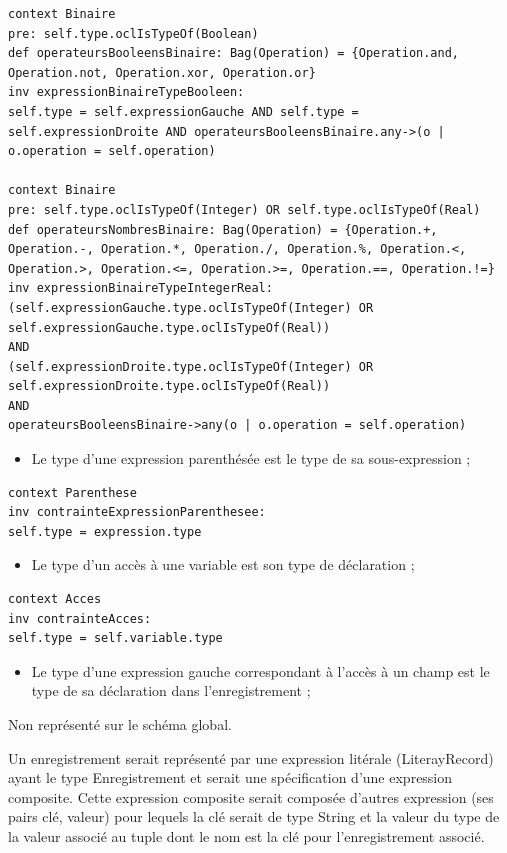 \documentclass[]{article}
\providecommand{\tightlist}{%
  \setlength{\itemsep}{0pt}\setlength{\parskip}{0pt}}
\begin{document}
\begin{verbatim}
context Binaire
pre: self.type.oclIsTypeOf(Boolean)
def operateursBooleensBinaire: Bag(Operation) = {Operation.and, Operation.not, Operation.xor, Operation.or}
inv expressionBinaireTypeBooleen: 
self.type = self.expressionGauche AND self.type = self.expressionDroite AND operateursBooleensBinaire.any->(o | o.operation = self.operation)

context Binaire
pre: self.type.oclIsTypeOf(Integer) OR self.type.oclIsTypeOf(Real)
def operateursNombresBinaire: Bag(Operation) = {Operation.+, Operation.-, Operation.*, Operation./, Operation.%, Operation.<, Operation.>, Operation.<=, Operation.>=, Operation.==, Operation.!=}
inv expressionBinaireTypeIntegerReal: 
(self.expressionGauche.type.oclIsTypeOf(Integer) OR self.expressionGauche.type.oclIsTypeOf(Real)) 
AND 
(self.expressionDroite.type.oclIsTypeOf(Integer) OR self.expressionDroite.type.oclIsTypeOf(Real))
AND 
operateursBooleensBinaire->any(o | o.operation = self.operation)
\end{verbatim}

\begin{itemize}
\tightlist
\item
  Le type d'une expression parenthésée est le type de sa sous-expression
  ;
\end{itemize}

\begin{verbatim}
context Parenthese
inv contrainteExpressionParenthesee:
self.type = expression.type
\end{verbatim}

\begin{itemize}
\tightlist
\item
  Le type d'un accès à une variable est son type de déclaration ;
\end{itemize}

\begin{verbatim}
context Acces
inv contrainteAcces:
self.type = self.variable.type
\end{verbatim}

\begin{itemize}
\tightlist
\item
  Le type d'une expression gauche correspondant à l'accès à un champ est
  le type de sa déclaration dans l'enregistrement ;
\end{itemize}

Non représenté sur le schéma global.

Un enregistrement serait représenté par une expression litérale
(LiterayRecord) ayant le type Enregistrement et serait une spécification
d'une expression composite. Cette expression composite serait composée
d'autres expression (ses pairs clé, valeur) pour lequels la clé serait
de type String et la valeur du type de la valeur associé au tuple dont
le nom est la clé pour l'enregistrement associé.
\end{document}
